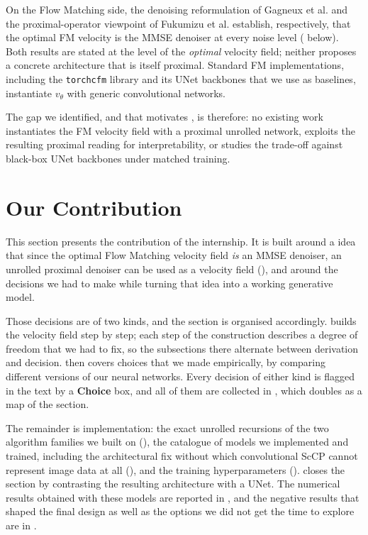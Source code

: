 \documentclass[a4paper,11pt]{article}
\theoremstyle{plain}{\theorembodyfont{\rmfamily}%
\newtheorem{proposition}[theorem]{Proposition}}
\theoremstyle{plain}{\theorembodyfont{\rmfamily}%
\newtheorem{notation}[theorem]{Notation}}
\theoremstyle{plain}{\theorembodyfont{\rmfamily}%
\newtheorem{assumption}[theorem]{Assumption}}
\theoremstyle{plain}{\theorembodyfont{\rmfamily}%
\newtheorem{problem}[theorem]{Problem}}
\theoremstyle{plain}{\theorembodyfont{\rmfamily}%
\newtheorem{example}[theorem]{Example}}
\theoremstyle{plain}{\theorembodyfont{\rmfamily}%
\newtheorem{remark}[theorem]{Remark}}
\theoremstyle{plain}{\theorembodyfont{\rmfamily}%
\newtheorem{definition}[theorem]{Definition}}
\theoremstyle{plain}{\theorembodyfont{\rmfamily}%
\newtheorem{question}[theorem]{Question}}
\numberwithin{equation}{section}
\begin{document}
On the Flow Matching side, the denoising reformulation of Gagneux et al.
\cite{gagneux2025avisualdive, gagneux2025generation} and the proximal-operator
viewpoint of Fukumizu et al. \cite{fukumizu2026proximal} establish, respectively,
that the optimal FM velocity is the MMSE denoiser at every noise level
( below). Both results are stated
at the level of the \emph{optimal} velocity field; neither proposes a concrete
architecture that is itself proximal. Standard FM implementations, including the
\texttt{torchcfm} library and its UNet backbones \cite{tong2024improving} that we
use as baselines, instantiate $v_\theta$ with generic convolutional networks.

The gap we identified, and that motivates , is therefore:
no existing work instantiates the FM velocity field with a proximal unrolled
network, exploits the resulting proximal reading for interpretability, or
studies the trade-off against black-box UNet backbones under matched training.

\section{Our Contribution}
\label{sec:contribution}

This section presents the contribution of the internship. It is built around a
idea that since the optimal Flow Matching velocity field \emph{is} an MMSE
denoiser, an unrolled proximal denoiser can be used as a velocity field
(), and around the decisions we had to make while turning that idea
into a working generative model.

Those decisions are of two kinds, and the section is organised accordingly.
 builds the velocity field step by step; each step of
the construction describes a degree of freedom that we had to fix, so the
subsections there alternate between derivation and decision. 
then covers choices that we made empirically, by comparing different versions of our neural networks. Every decision of either kind is
flagged in the text by a \textbf{Choice} box, and all of them are collected in
, which doubles as a map of the section.

The remainder is implementation: the exact unrolled recursions of the two
algorithm families we built on (), the catalogue of
models we implemented and trained, including the architectural fix without which
convolutional ScCP cannot represent image data at all (), and
the training hyperparameters ().
 closes the section by contrasting the resulting
architecture with a UNet. The numerical results obtained with these models are
reported in , and the negative results that shaped the final
design as well as the options we did not get the time to explore are in .
\end{document}
